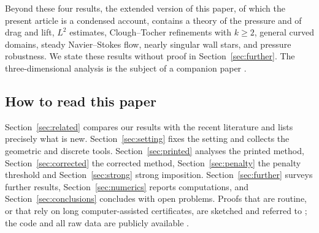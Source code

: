 Beyond these four results, the extended version \cite{PadhiExt} of this paper, of which the present article is a condensed account, contains a theory of the pressure and of drag and lift, $L^2$ estimates, Clough--Tocher refinements with $k\ge2$, general curved domains, steady Navier--Stokes flow, nearly singular wall stars, and pressure robustness. We state these results without proof in Section~\ref{sec:further}. The three-dimensional analysis is the subject of a companion paper \cite{PadhiThreeD}.

\subsection{How to read this paper}
Section~\ref{sec:related} compares our results with the recent literature and lists precisely what is new. Section~\ref{sec:setting} fixes the setting and collects the geometric and discrete tools. Section~\ref{sec:printed} analyses the printed method, Section~\ref{sec:corrected} the corrected method, Section~\ref{sec:penalty} the penalty threshold and Section~\ref{sec:strong} strong imposition. Section~\ref{sec:further} surveys further results, Section~\ref{sec:numerics} reports computations, and Section~\ref{sec:conclusions} concludes with open problems. Proofs that are routine, or that rely on long computer-assisted certificates, are sketched and referred to \cite{PadhiExt}; the code and all raw data are publicly available \cite{ZeroGradRepo}.

